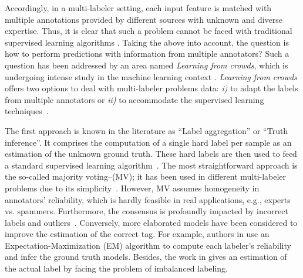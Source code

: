 \documentclass[journal]{IEEEtran}
\begin{document}
Accordingly, in a multi-labeler setting, each input feature is matched with multiple annotations provided by different sources with unknown and diverse expertise. Thus, it is clear that such a problem cannot be faced with traditional supervised learning algorithms \cite{tao2018domain,wang2016bi}. Taking the above into account, the question is how to perform predictions with information from multiple annotators? Such a question has been addressed by an area named \emph{Learning from crowds}, which is undergoing intense study in the machine learning context \cite{groot2011learning}. \emph{Learning from crowds} offers two options to deal with multi-labeler problems data: \textit{i)} to adapt the labels from multiple annotators or \textit{ii)} to accommodate the supervised learning techniques~\cite{rizos2020average}. 

The first approach is known in the literature as ``Label aggregation'' or ``Truth inference''. It comprises the computation of a single hard label per sample as an estimation of the unknown ground truth. These hard labels are then used to feed a standard supervised learning algorithm~\cite{morales2019scalable}. The most straightforward approach is the so-called majority voting--(MV); it has been used in different multi-labeler problems due to its simplicity~\cite{zhang2014imbalanced}. However, MV assumes homogeneity in annotators' reliability, which is hardly feasible in real applications, e.g., experts vs. spammers. Furthermore, the consensus is profoundly impacted by incorrect labels and outliers~\cite{kara2015modeling}. Conversely, more elaborated models have been considered to improve the estimation of the correct tag. For example, authors in \cite{dawid1979maximum} use an Expectation-Maximization (EM) algorithm to compute each labeler's reliability and infer the ground truth models. Besides, the work in \cite{zhang2014imbalanced} gives an estimation of the actual label by facing the problem of imbalanced labeling.  
\end{document}

